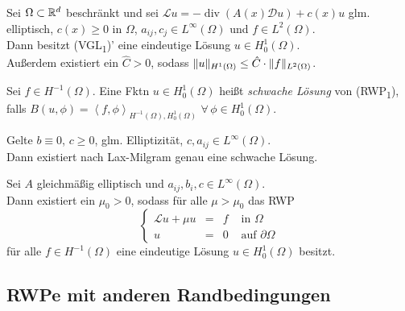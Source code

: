 \documentclass{cheat-sheet}
\newcommand{\bOmega}{\partial \Omega} %
\newcommand{\LL}{\mathcal{L}} %
\DeclareMathOperator{\dive}{div} %
\newcommand{\tss}[1]{\textsubscript{#1}} %
\newcommand{\DO}{\mathcal{D}} %
\newcommand{\scp}[2]{\left\langle #1 , #2 \right\rangle} %
\begin{document}
\begin{satz}
  Sei $\Omega \subset \mathbb{R}^d$ beschränkt und sei $\mathcal{L} u = - \dive (A(x) \DO u) + c(x) u$ glm. elliptisch, $c(x) \geq 0$ in $\Omega$, $a_{ij}, c_j \in L^\infty(\Omega)$ und $f \in L^2(\Omega)$. \\
  Dann besitzt (VGL\tss{1})' eine eindeutige Lösung $u \in H_0^1(\Omega)$. \\
  Außerdem existiert ein $\hat{C} > 0$, sodass $\lVert u\rVert_{H^1(\Omega)} \leq \hat{C} \cdot \lVert f\rVert_{L^2(\Omega)}$.
\end{satz}

\begin{samepage}

\begin{defn}
  Sei $f \in H^{-1}(\Omega)$.
  Eine Fktn $u \in H_0^1(\Omega)$ heißt \textit{schwache Lösung} von (RWP\tss{1}), falls \enspace
  $B(u, \phi) = \scp{f}{\phi}_{H^{-1}(\Omega), H_0^1(\Omega)}$ $\forall \, \phi \in H_0^1(\Omega)$.
\end{defn}

\begin{bem}
  Gelte $b \equiv 0$, $c \geq 0$, glm. Elliptizität, $c, a_{ij} \in L^\infty(\Omega)$. \\
  Dann existiert nach Lax-Milgram genau eine schwache Lösung.
\end{bem}

\begin{lem}
  Sei $A$ gleichmäßig elliptisch und $a_{ij}, b_i, c \in L^\infty(\Omega)$. \\
  Dann existiert ein $\mu_0 > 0$, sodass für alle $\mu > \mu_0$ das RWP
  \[
    \left\{ \begin{array}{rlll}
      \LL u + \mu u &=& f &\text{ in $\Omega$} \\
      u &=& 0 &\text{ auf $\bOmega$}
    \end{array} \right.
  \]
  für alle $f \in H^{-1}(\Omega)$ eine eindeutige Lösung $u \in H_0^1(\Omega)$ besitzt.
\end{lem}


\subsection{RWPe mit anderen Randbedingungen}

\end{samepage}
\end{document}
